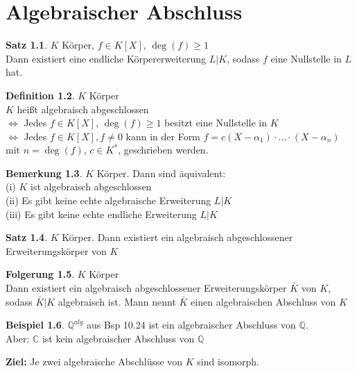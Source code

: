 \documentclass[10pt,a4paper,numbers=endperiod]{scrreprt}
\theoremstyle{definition}
\newtheorem{satz}{Satz}[section]
\newtheorem{defi}[satz]{Definition}
\newtheorem{bem}[satz]{Bemerkung}
\newtheorem{bsp}[satz]{Beispiel}
\newtheorem{folg}[satz]{Folgerung}
\def\QQ{{\mathbb Q}}
\def\CC{{\mathbb C}}
\begin{document}
\chapter{Algebraischer Abschluss}

\begin{satz}
	$K$ Körper, $f \in K[X]$, $\deg(f) \geq 1$\\
	Dann existiert eine endliche Körpererweiterung $L|K$, sodass $f$ eine Nullstelle in $L$ hat.
\end{satz}

\begin{defi}
	$K$ Körper\\
	$K$ heißt algebraisch abgeschlossen\\
	$\Leftrightarrow$ Jedes $f \in K[X]$, $\deg(f) \geq 1$ besitzt eine Nullstelle in $K$\\
	$\Leftrightarrow$ Jedes $f \in K[X], f \neq 0$ kann in der Form $f = c(X - \alpha_1) \cdot \ldots \cdot (X - \alpha_n)$ mit $n = \deg(f)$, $c \in K^*$, geschrieben werden.
\end{defi}

\begin{bem}
	$K$ Körper. Dann sind äquivalent:\\
	(i) $K$ ist algebraisch abgeschlossen\\
	(ii) Es gibt keine echte algebraische Erweiterung $L|K$\\
	(iii) Es gibt keine echte endliche Erweiterung $L|K$
\end{bem}

\begin{satz}
	$K$ Körper. Dann existiert ein algebraisch abgeschlossener Erweiterungskörper von $K$
\end{satz}

\begin{folg}
	$K$ Körper\\
	Dann existiert ein algebraisch abgeschlossener Erweiterungskörper $\bar{K}$ von $K$, sodass $\bar{K}|K$ algebraisch ist. Mann nennt $\bar{K}$ einen algebraischen Abschluss von $K$
\end{folg}

\begin{bsp}
	$\QQ^{alg}$ aus Bsp 10.24 ist ein algebraischer Abschluss von $\QQ$.\\
	Aber: $\CC$ ist kein algebraischer Abschluss von $\QQ$
\end{bsp}

\textbf{Ziel:} Je zwei algebraische Abschlüsse von $K$ sind isomorph.
\end{document}
